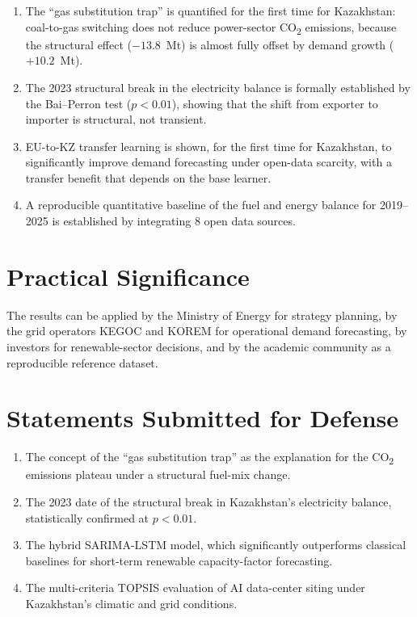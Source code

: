 \begin{enumerate}[topsep=2pt, itemsep=1pt]
    \item The ``gas substitution trap'' is quantified for the first time for Kazakhstan: coal-to-gas switching does not reduce power-sector CO\textsubscript{2} emissions, because the structural effect ($-13.8$~Mt) is almost fully offset by demand growth ($+10.2$~Mt).
    \item The 2023 structural break in the electricity balance is formally established by the Bai--Perron test ($p < 0.01$), showing that the shift from exporter to importer is structural, not transient.
    \item EU-to-KZ transfer learning is shown, for the first time for Kazakhstan, to significantly improve demand forecasting under open-data scarcity, with a transfer benefit that depends on the base learner.
    \item A reproducible quantitative baseline of the fuel and energy balance for 2019--2025 is established by integrating 8 open data sources.
\end{enumerate}

\section{Practical Significance}
\label{sec:practical}

The results can be applied by the Ministry of Energy for strategy planning, by the grid operators KEGOC and KOREM for operational demand forecasting, by investors for renewable-sector decisions, and by the academic community as a reproducible reference dataset.

\section{Statements Submitted for Defense}
\label{sec:defended}

\begin{enumerate}[topsep=2pt, itemsep=1pt]
    \item The concept of the ``gas substitution trap'' as the explanation for the CO\textsubscript{2} emissions plateau under a structural fuel-mix change.
    \item The 2023 date of the structural break in Kazakhstan's electricity balance, statistically confirmed at $p < 0.01$.
    \item The hybrid SARIMA-LSTM model, which significantly outperforms classical baselines for short-term renewable capacity-factor forecasting.
    \item The multi-criteria TOPSIS evaluation of AI data-center siting under Kazakhstan's climatic and grid conditions.
\end{enumerate}

